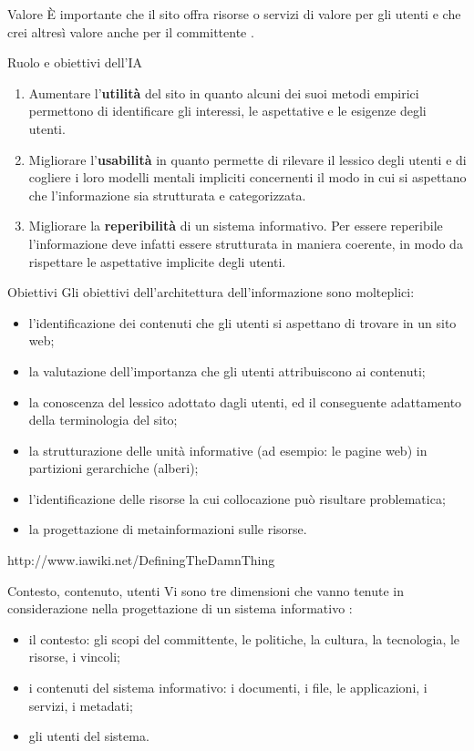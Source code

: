 \documentclass[pdf,mpa]{prosper}
\begin{document}
\begin{slide}{Valore}
È importante che il sito offra risorse o servizi di valore per gli utenti e che crei altresì valore anche per il committente \citep{Conci2006}.
\end{slide}

\begin{slide}{Ruolo e obiettivi dell'IA}
\begin{enumerate}
\item Aumentare l'\textbf{utilità} del sito in quanto alcuni dei suoi metodi empirici permettono di identificare gli interessi, le aspettative e le esigenze degli utenti.
\item Migliorare l'\textbf{usabilità} in quanto permette di rilevare il lessico degli utenti e di cogliere i loro modelli mentali impliciti concernenti il modo in cui si aspettano che l'informazione sia strutturata e categorizzata.
\item Migliorare la \textbf{reperibilità} di un sistema informativo. Per essere reperibile l'informazione deve infatti essere strutturata in maniera coerente, in modo da rispettare le aspettative implicite degli utenti.
\end{enumerate}

\end{slide}

\begin{slide}{Obiettivi}
Gli obiettivi dell'architettura dell'informazione sono molteplici:
\begin{itemize}
\item l'identificazione dei contenuti che gli utenti si aspettano di trovare in un sito web;
\item la valutazione dell'importanza che gli utenti attribuiscono ai contenuti;
\item la conoscenza del lessico adottato dagli utenti, ed il conseguente adattamento della terminologia del sito;
\item la strutturazione delle unità informative (ad esempio: le pagine web) in partizioni gerarchiche (alberi);
\item l'identificazione delle risorse la cui collocazione può risultare problematica;
\item la progettazione di metainformazioni sulle risorse.
\end{itemize}
http://www.iawiki.net/DefiningTheDamnThing
\end{slide}

\begin{slide}{Contesto, contenuto, utenti}
Vi sono tre dimensioni che vanno tenute in considerazione nella progettazione di un sistema informativo \citep{RosenfeldMorville1998}:
\begin{itemize}
\item il contesto: gli scopi del committente, le politiche, la cultura, la tecnologia, le risorse, i vincoli;
\item i contenuti del sistema informativo: i documenti, i file, le applicazioni, i servizi, i metadati;
\item gli utenti del sistema.
\end{itemize}
\end{slide}
\end{document}
